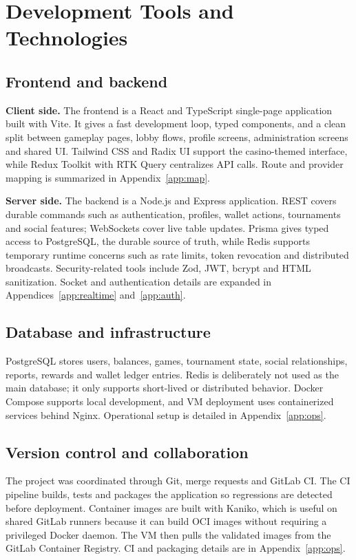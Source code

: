 \documentclass[11pt,a4paper]{article}
\begin{document}
\section{Development Tools and Technologies}
\label{sec:tools}

\subsection{Frontend and backend}

\textbf{Client side.} The frontend is a React and TypeScript single-page application built with Vite. It gives a fast development loop, typed components, and a clean split between gameplay pages, lobby flows, profile screens, administration screens and shared UI. Tailwind CSS and Radix UI support the casino-themed interface, while Redux Toolkit with RTK Query centralizes API calls. Route and provider mapping is summarized in Appendix~\ref{app:map}.

\textbf{Server side.} The backend is a Node.js and Express application. REST covers durable commands such as authentication, profiles, wallet actions, tournaments and social features; WebSockets cover live table updates. Prisma gives typed access to PostgreSQL, the durable source of truth, while Redis supports temporary runtime concerns such as rate limits, token revocation and distributed broadcasts. Security-related tools include Zod, JWT, bcrypt and HTML sanitization. Socket and authentication details are expanded in Appendices~\ref{app:realtime} and~\ref{app:auth}.

\subsection{Database and infrastructure}

PostgreSQL stores users, balances, games, tournament state, social relationships, reports, rewards and wallet ledger entries. Redis is deliberately not used as the main database; it only supports short-lived or distributed behavior. Docker Compose supports local development, and VM deployment uses containerized services behind Nginx. Operational setup is detailed in Appendix~\ref{app:ops}.

\subsection{Version control and collaboration}

The project was coordinated through Git, merge requests and GitLab CI. The CI pipeline builds, tests and packages the application so regressions are detected before deployment. Container images are built with Kaniko, which is useful on shared GitLab runners because it can build OCI images without requiring a privileged Docker daemon. The VM then pulls the validated images from the GitLab Container Registry. CI and packaging details are in Appendix~\ref{app:ops}.
\end{document}
